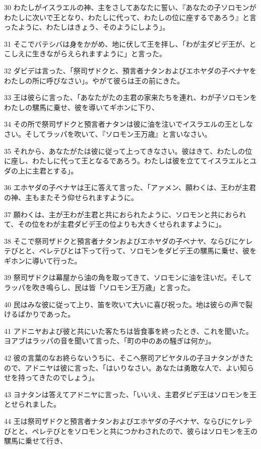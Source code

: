 \par 30 わたしがイスラエルの神、主をさしてあなたに誓い、『あなたの子ソロモンがわたしに次いで王となり、わたしに代って、わたしの位に座するであろう』と言ったように、わたしはきょう、そのようにしよう」。
\par 31 そこでバテシバは身をかがめ、地に伏して王を拝し、「わが主ダビデ王が、とこしえに生きながらえられますように」と言った。
\par 32 ダビデは言った、「祭司ザドクと、預言者ナタンおよびエホヤダの子ベナヤをわたしの所に呼びなさい」。やがて彼らは王の前にきた。
\par 33 王は彼らに言った、「あなたがたの主君の家来たちを連れ、わが子ソロモンをわたしの騾馬に乗せ、彼を導いてギホンに下り、
\par 34 その所で祭司ザドクと預言者ナタンは彼に油を注いでイスラエルの王としなさい。そしてラッパを吹いて、『ソロモン王万歳』と言いなさい。
\par 35 それから、あなたがたは彼に従って上ってきなさい。彼はきて、わたしの位に座し、わたしに代って王となるであろう。わたしは彼を立ててイスラエルとユダの上に主君とする」。
\par 36 エホヤダの子ベナヤは王に答えて言った、「アァメン、願わくは、王わが主君の神、主もまたそう仰せられますように。
\par 37 願わくは、主が王わが主君と共におられたように、ソロモンと共におられて、その位をわが主君ダビデ王の位よりも大きくせられますように」。
\par 38 そこで祭司ザドクと預言者ナタンおよびエホヤダの子ベナヤ、ならびにケレテびとと、ペレテびとは下って行って、ソロモンをダビデ王の騾馬に乗せ、彼をギホンに導いて行った。
\par 39 祭司ザドクは幕屋から油の角を取ってきて、ソロモンに油を注いだ。そしてラッパを吹き鳴らし、民は皆「ソロモン王万歳」と言った。
\par 40 民はみな彼に従って上り、笛を吹いて大いに喜び祝った。地は彼らの声で裂けるばかりであった。
\par 41 アドニヤおよび彼と共にいた客たちは皆食事を終ったとき、これを聞いた。ヨアブはラッパの音を聞いて言った、「町の中のあの騒ぎは何か」。
\par 42 彼の言葉のなお終らないうちに、そこへ祭司アビヤタルの子ヨナタンがきたので、アドニヤは彼に言った、「はいりなさい。あなたは勇敢な人で、よい知らせを持ってきたのでしょう」。
\par 43 ヨナタンは答えてアドニヤに言った、「いいえ、主君ダビデ王はソロモンを王とせられました。
\par 44 王は祭司ザドクと預言者ナタンおよびエホヤダの子ベナヤ、ならびにケレテびとと、ペレテびとをソロモンと共につかわされたので、彼らはソロモンを王の騾馬に乗せて行き、
